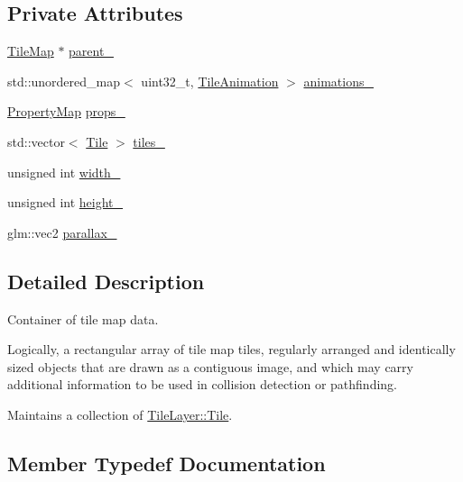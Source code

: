 \subsection*{Private Attributes}
\begin{DoxyCompactItemize}
\item 
\hyperlink{classpixel_1_1_tile_map}{Tile\+Map} $\ast$ \hyperlink{classpixel_1_1_tile_layer_af4ce211cba5a10a4bf124abefe1ead3c}{parent\+\_\+}
\item 
std\+::unordered\+\_\+map$<$ uint32\+\_\+t, \hyperlink{classpixel_1_1_tile_layer_1_1_tile_animation}{Tile\+Animation} $>$ \hyperlink{classpixel_1_1_tile_layer_acfdf684d2b5068389f7af757cd7c564e}{animations\+\_\+}
\item 
\hyperlink{classpixel_1_1_tile_layer_a574b12c49854419c8ffb25e3a0929b57}{Property\+Map} \hyperlink{classpixel_1_1_tile_layer_a24b7aa1484904926e2ff68958269448c}{props\+\_\+}
\item 
std\+::vector$<$ \hyperlink{structpixel_1_1_tile_layer_1_1_tile}{Tile} $>$ \hyperlink{classpixel_1_1_tile_layer_ab94b13dc20c47ddf7e26546bdcfff497}{tiles\+\_\+}
\item 
unsigned int \hyperlink{classpixel_1_1_tile_layer_a5a2c300689cf5fd25f44eea6b1ac5cd7}{width\+\_\+}
\item 
unsigned int \hyperlink{classpixel_1_1_tile_layer_abc0fb75ecadd59981e7148d3399e9631}{height\+\_\+}
\item 
glm\+::vec2 \hyperlink{classpixel_1_1_tile_layer_a3bea19601f8f1647503aee823664f91f}{parallax\+\_\+}
\end{DoxyCompactItemize}


\subsection{Detailed Description}
Container of tile map data. 

Logically, a rectangular array of tile map tiles, regularly arranged and identically sized objects that are drawn as a contiguous image, and which may carry additional information to be used in collision detection or pathfinding.

Maintains a collection of \hyperlink{structpixel_1_1_tile_layer_1_1_tile}{Tile\+Layer\+::\+Tile}. 

\subsection{Member Typedef Documentation}
\mbox{\label{classpixel_1_1_tile_layer_a574b12c49854419c8ffb25e3a0929b57}} 
